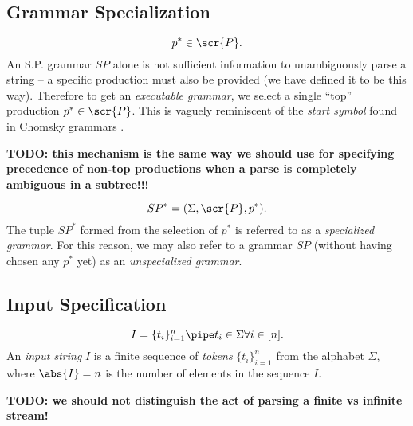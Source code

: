 \documentclass[10pt]{article}
\begin{document}

\subsection{Grammar Specialization}
\label{sec:grammar-specialization}
\begin{equation}
  \label{eq:p-top}
  p^* \in \scr{P}.
\end{equation}
An S.P. grammar $SP$ alone is not sufficient information to unambiguously parse a string -- a specific production must also be provided (we have defined it to be this way). Therefore to get an \textit{executable grammar}, we select a single ``top'' production $p^* \in \scr{P}$. This is vaguely reminiscent of the \textit{start symbol} found in Chomsky grammars .

\textbf{TODO: this mechanism is the same way we should use for specifying precedence of non-top productions when a parse is completely ambiguous in a subtree!!!}

\begin{equation}
  \label{eq:specialized}
  SP^* = (\Sigma, \scr{P}, p^*).
\end{equation}
The tuple $SP^*$ formed from the selection of $p^*$ is referred to as a \textit{specialized grammar}. For this reason, we may also refer to a grammar $SP$ (without having chosen any $p^*$ yet) as an \textit{unspecialized grammar}.

\subsection{Input Specification}
\label{sec:input-specification}
\begin{equation}
  \label{eq:input-string-tokens}
  I = \{t_i\}_{i=1}^n \pipe t_i \in \Sigma \forall i \in [n].
\end{equation}
An \textit{input string} $I$ is a finite sequence of \textit{tokens} $\{t_i\}_{i=1}^n$ from the alphabet $\Sigma$, where $\abs{I} = n$ is the number of elements in the sequence $I$.

\textbf{TODO: we should not distinguish the act of parsing a finite vs infinite stream!}
\end{document}
